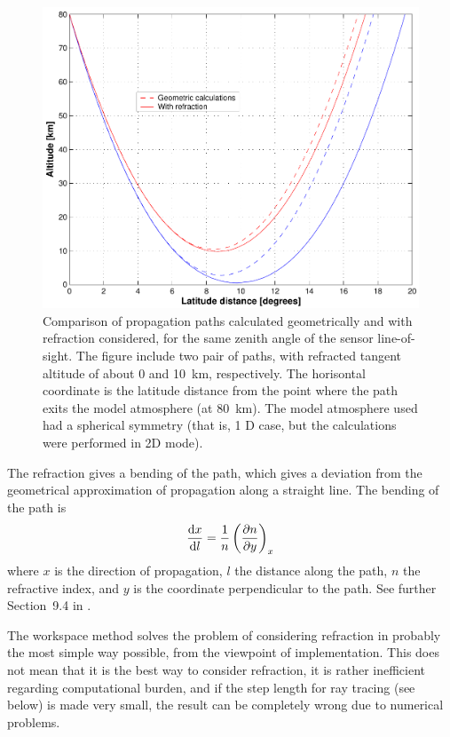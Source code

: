 \begin{figure}[!t]
 \begin{center}
  \includegraphics*[width=0.80\hsize]{Figs/ppath/ppath_refr1}
  \caption{Comparison of propagation paths calculated geometrically and 
    with refraction considered, for the same zenith angle of the
    sensor line-of-sight. The figure include two pair of paths, with
    refracted tangent altitude of about 0 and 10~km, respectively.
    The horisontal coordinate is the latitude distance from the point
    where the path exits the model atmosphere (at 80~km). The model
    atmosphere used had a spherical symmetry (that is, 1 D case, but
    the calculations were performed in 2D mode).}
  \label{fig:ppath:ppath_refr1}  
 \end{center}
\end{figure}


The refraction gives a bending of the path, which gives a deviation
from the geometrical approximation of propagation along a straight
line. The bending of the path is 
\begin{equation}
  \frac{\mathrm{d} x}{\mathrm{d} l} = \frac{1}{n} \left( \frac{\partial n}{\partial y} \right)_x
  \label{eq:ppath:refrbend}
\end{equation}
where $x$ is the direction of propagation, $l$ the distance along the
path, $n$ the refractive index, and $y$ is the coordinate
perpendicular to the path. See further Section~9.4 in
\citet{rodgers:00}.

The workspace method  solves the
problem of considering refraction in probably the most simple way
possible, from the viewpoint of implementation. This does not mean
that it is the best way to consider refraction, it is rather
inefficient regarding computational burden, and if the step length
for ray tracing (see below) is made very small, the result can be
completely wrong due to numerical problems.

